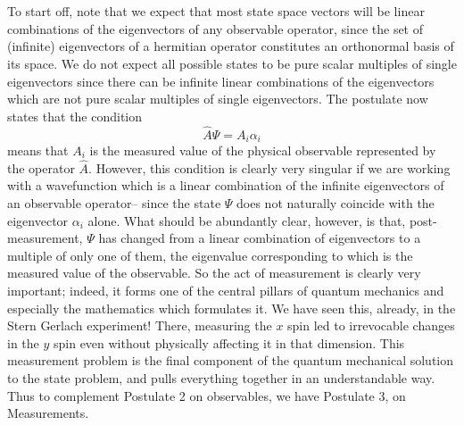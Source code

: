 \\\\
To start off, note that we expect that most state space vectors will be linear combinations of the eigenvectors of any observable operator, since the set of (infinite) eigenvectors of a hermitian operator constitutes an orthonormal basis of its space. We do not expect all possible states to be pure scalar multiples of single eigenvectors since there can be infinite linear combinations of the eigenvectors which are not pure scalar multiples of single eigenvectors. 
The postulate now states that the condition
\[
\hat{A}\Psi=A_{i}\alpha_{i}\]
means that $A_{i}$ is the measured value of the physical observable represented by the operator $\hat{A}$. However, this condition is clearly very singular if we are working with a wavefunction which is a linear combination of the infinite eigenvectors of an observable operator-- since the state $\Psi$ does not naturally coincide with the eigenvector $\alpha_{i}$ alone. What should be abundantly clear, however, is that, post-measurement, $\Psi$ has changed from a linear combination of eigenvectors to a multiple of only one of them, the eigenvalue corresponding to which is the measured value of the observable. So the act of measurement is clearly very important; indeed, it forms one of the central pillars of quantum mechanics and especially the mathematics which formulates it. We have seen this, already, in the Stern Gerlach experiment! There, measuring the $x$ spin led to irrevocable changes in the $y$ spin even without physically affecting it in that dimension. This measurement problem is the final component of the quantum mechanical solution to the state problem, and pulls everything together in an understandable way. Thus to complement Postulate 2 on observables, we have Postulate 3, on Measurements.
